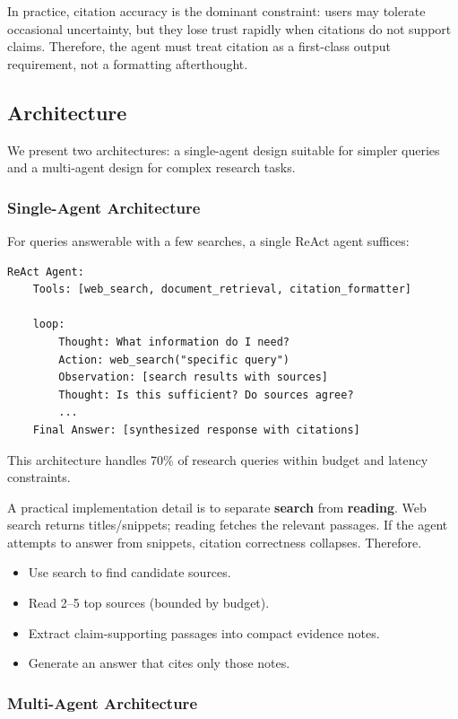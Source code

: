 In practice, citation accuracy is the dominant constraint: users may tolerate occasional uncertainty, but they lose trust rapidly when citations do not support claims. Therefore, the agent must treat citation as a first-class output requirement, not a formatting afterthought.

\subsection{Architecture}

We present two architectures: a single-agent design suitable for simpler queries and a multi-agent design for complex research tasks.

\subsubsection{Single-Agent Architecture}

For queries answerable with a few searches, a single ReAct agent suffices:

{\footnotesize
\begin{verbatim}
ReAct Agent:
    Tools: [web_search, document_retrieval, citation_formatter]
    
    loop:
        Thought: What information do I need?
        Action: web_search("specific query")
        Observation: [search results with sources]
        Thought: Is this sufficient? Do sources agree?
        ...
    Final Answer: [synthesized response with citations]
\end{verbatim}
}

This architecture handles 70\% of research queries within budget and latency constraints.

A practical implementation detail is to separate \textbf{search} from \textbf{reading}. Web search returns titles/snippets; reading fetches the relevant passages. If the agent attempts to answer from snippets, citation correctness collapses. Therefore.
\begin{itemize}
\item Use search to find candidate sources.
\item Read 2--5 top sources (bounded by budget).
\item Extract claim-supporting passages into compact evidence notes.
\item Generate an answer that cites only those notes.
\end{itemize}

\subsubsection{Multi-Agent Architecture}

